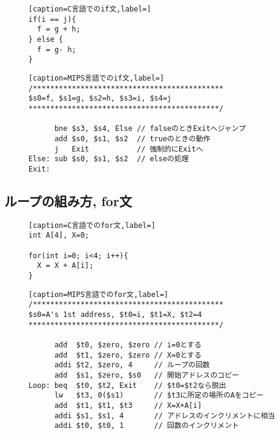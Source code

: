 \documentclass[a4paper, xelatex, ja=standard]{bxjsarticle}
\begin{document}
\begin{figure}[h]
\centering
\begin{minipage}[t]{0.3\linewidth}
\begin{lstlisting}[caption=C言語でのif文,label=]
if(i == j){
  f = g + h;
} else {
  f = g- h;
}
\end{lstlisting}
\end{minipage}
\hspace{15pt}
\begin{minipage}[t]{0.5\linewidth}
\begin{lstlisting}[caption=MIPS言語でのif文,label=]
/********************************************
$s0=f, $s1=g, $s2=h, $s3=i, $s4=j
********************************************/

      bne $s3, $s4, Else // falseのときExitへジャンプ
      add $s0, $s1, $s2  // trueのときの動作
      j   Exit           // 強制的にExitへ
Else: sub $s0, $s1, $s2  // elseの処理
Exit:
\end{lstlisting}
\end{minipage}
\label{}
\end{figure}

\subsection{ループの組み方, for文}

\begin{figure}[h]
\centering
\begin{minipage}[t]{0.3\linewidth}
\begin{lstlisting}[caption=C言語でのfor文,label=]
int A[4], X=0;

for(int i=0; i<4; i++){
  X = X + A[i];
}
\end{lstlisting}
\end{minipage}
\hspace{15pt}
\begin{minipage}[t]{0.5\linewidth}
\begin{lstlisting}[caption=MIPS言語でのfor文,label=]
/********************************************
$s0=A's 1st address, $t0=i, $t1=X, $t2=4
********************************************/

      add  $t0, $zero, $zero // i=0とする
      add  $t1, $zero, $zero // X=0とする
      addi $t2, $zero, 4     // ループの回数
      add  $s1, $zero, $s0   // 開始アドレスのコピー
Loop: beq  $t0, $t2, Exit    // $t0=$t2なら脱出
      lw   $t3, 0($s1)       // $t3に所定の場所のAをコピー
      add  $t1, $t1, $t3     // X=X+A[i] 
      addi $s1, $s1, 4       // アドレスのインクリメントに相当
      addi $t0, $t0, 1       // 回数のインクリメント
\end{lstlisting}
\end{minipage}
\label{}
\end{figure}
\clearpage
\end{document}
